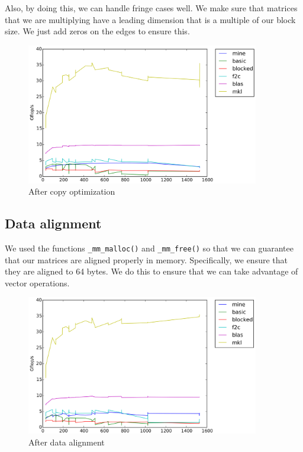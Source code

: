 \documentclass[11pt]{article}
\begin{document}
        Also, by doing this, we can handle fringe cases well. We make sure that matrices that we are multiplying have a leading dimension that is a multiple of our block size. We just add zeros on the edges to ensure this.
        
        \begin{figure}[H]
            \centering
            \includegraphics[width=4in]{timing_32_cp.png}
            \caption{After copy optimization}
        \end{figure}
        


        \subsection{Data alignment}
        We used the functions \texttt{\_mm\_malloc()} and \texttt{\_mm\_free()} so that we can guarantee that our matrices are aligned properly in memory. Specifically, we ensure that they are aligned to 64 bytes. We do this to ensure that we can take advantage of vector operations.
        
        \begin{figure}[H]
        	\centering
            \includegraphics[width=4in]{timing_vector_32_cp.png}
        	\caption{After data alignment}
        \end{figure}
        \clearpage
        
\end{document}
